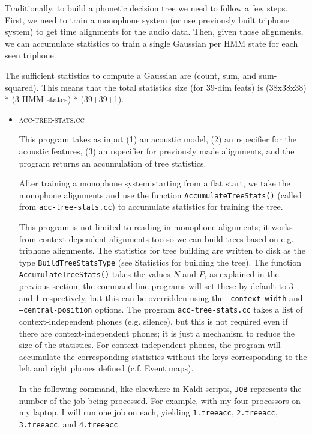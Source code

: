 \documentclass[10pt,a4paper]{article}
\begin{document}
\begin{itemize}
  Traditionally, to build a phonetic decision tree we need to follow a few steps. First, we need to train a monophone system (or use previously built triphone system) to get time alignments for the audio data. Then, given those alignments, we can accumulate statistics to train a single Gaussian per HMM state for each seen triphone.

  The sufficient statistics to compute a Gaussian are (count, sum, and sum-squared). This means that the total statistics size (for 39-dim feats) is (38x38x38) * (3 HMM-states) * (39+39+1). 


  \begin{itemize}
    \vspace{.25cm}
  \item \textsc{acc-tree-stats.cc}

    This program takes as input (1) an acoustic model, (2) an rspecifier for the acoustic features, (3) an rspecifier for previously made alignments, and the program returns an accumulation of tree statistics.

    After training a monophone system starting from a flat start, we take the monophone alignments and use the function \texttt{AccumulateTreeStats()} (called from \texttt{acc-tree-stats.cc}) to accumulate statistics for training the tree. 

    This program is not limited to reading in monophone alignments; it works from context-dependent alignments too so we can build trees based on e.g. triphone alignments. The statistics for tree building are written to disk as the type \texttt{BuildTreeStatsType} (see Statistics for building the tree). The function \texttt{AccumulateTreeStats()} takes the values $N$ and $P$, as explained in the previous section; the command-line programs will set these by default to 3 and 1 respectively, but this can be overridden using the \texttt{--context-width} and \texttt{--central-position} options. The program \texttt{acc-tree-stats.cc} takes a list of context-independent phones (e.g. silence), but this is not required even if there are context-independent phones; it is just a mechanism to reduce the size of the statistics. For context-independent phones, the program will accumulate the corresponding statistics without the keys corresponding to the left and right phones defined (c.f. Event maps). 

In the following command, like elsewhere in Kaldi scripts, \texttt{JOB} represents the number of the job being processed. For example, with my four processors on my laptop, I will run one job on each, yielding \texttt{1.treeacc}, \texttt{2.treeacc}, \texttt{3.treeacc}, and \texttt{4.treeacc}. \\
    

\end{itemize}
\end{itemize}
\end{document}
